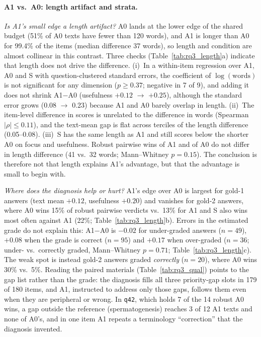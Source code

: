 \documentclass[11pt]{article}
\begin{document}
\paragraph{A1 vs.\ A0: length artifact and strata.} \emph{Is A1's small edge a length artifact?} A0 lands at the lower edge of the shared budget (51\% of A0 texts have fewer than 120 words), and A1 is longer than A0 for 99.4\% of the items (median difference 37 words), so length and condition are almost collinear in this contrast. Three checks (Table~\ref{tab:rq3_length}a) indicate that length does not drive the difference. (i)~In a within-item regression over A1, A0 and S with question-clustered standard errors, the coefficient of $\log(\text{words})$ is not significant for any dimension ($p\ge 0.37$; negative in 7 of 9), and adding it does not shrink A1$-$A0 (usefulness $+0.12$ $\to$ $+0.25$), although the standard error grows (0.08 $\to$ 0.23) because A1 and A0 barely overlap in length. (ii)~The item-level difference in scores is unrelated to the difference in words (Spearman $|\rho|\le 0.11$), and the text-mean gap is flat across terciles of the length difference (0.05--0.08). (iii)~S has the same length as A1 and still scores below the shorter A0 on focus and usefulness. Robust pairwise wins of A1 and of A0 do not differ in length difference (41 vs.\ 32 words; Mann--Whitney $p{=}0.15$). The conclusion is therefore not that length explains A1's advantage, but that the advantage is small to begin with.

\emph{Where does the diagnosis help or hurt?} A1's edge over A0 is largest for gold-1 answers (text mean $+0.12$, usefulness $+0.20$) and vanishes for gold-2 answers, where A0 wins 15\% of robust pairwise verdicts vs.\ 13\% for A1 and S also wins most often against A1 (22\%; Table~\ref{tab:rq3_length}b). Errors in the estimated grade do not explain this: A1$-$A0 is $-0.02$ for under-graded answers ($n{=}49$), $+0.08$ when the grade is correct ($n{=}95$) and $+0.17$ when over-graded ($n{=}36$; under- vs.\ correctly graded, Mann--Whitney $p{=}0.71$; Table~\ref{tab:rq3_length}c). The weak spot is instead gold-2 answers graded \emph{correctly} ($n{=}20$), where A0 wins 30\% vs.\ 5\%. Reading the paired materials (Table~\ref{tab:rq3_qual}) points to the gap list rather than the grade: the diagnosis fills all three priority-gap slots in 179 of 180 items, and A1, instructed to address only those gaps, follows them even when they are peripheral or wrong. In \texttt{q42}, which holds 7 of the 14 robust A0 wins, a gap outside the reference (spermatogenesis) reaches 3 of 12 A1 texts and none of A0's, and in one item A1 repeats a terminology ``correction'' that the diagnosis invented.
\end{document}
